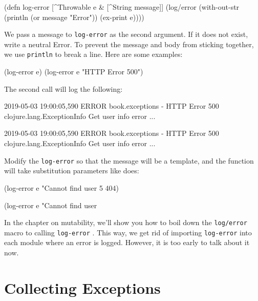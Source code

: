 \begin{clojure}
(defn log-error
  [^Throwable e & [^String message]]
  (log/error
   (with-out-str
     (println (or message "Error"))
     (ex-print e))))
\end{clojure}

We pass a message to \verb|log-error| as the second argument. If it does not exist, write a neutral Error. To prevent the message and body from sticking together, we use \verb|println| to break a line. Here are some examples:

\begin{clojure}
(log-error e)
(log-error e "HTTP Error 500")
\end{clojure}

The second call will log the following:

\ifnarrow

\begin{text}
2019-05-03 19:00:05,590 ERROR
book.exceptions - HTTP Error 500
clojure.lang.ExceptionInfo
  Get user info error
  ...
\end{text}

\else

\begin{text}
2019-05-03 19:00:05,590 ERROR book.exceptions - HTTP Error 500
clojure.lang.ExceptionInfo
  Get user info error
  ...
\end{text}

\fi

Modify the \verb|log-error| so that the message will be a template, and the function will take substitution parameters like  does:

\ifnarrow

\begin{clojure}
(log-error e
  "Cannot find user %
  5 404)
\end{clojure}

\else

\begin{clojure}
(log-error e "Cannot find user %
\end{clojure}

\fi

In the chapter on mutability, we'll show you how to boil down the \verb|log/error| macro to calling \verb|log-error| . This way, we get rid of importing \verb|log-error| into each module where an error is logged. However, it is too early to talk about it now.

\section{Collecting Exceptions}

